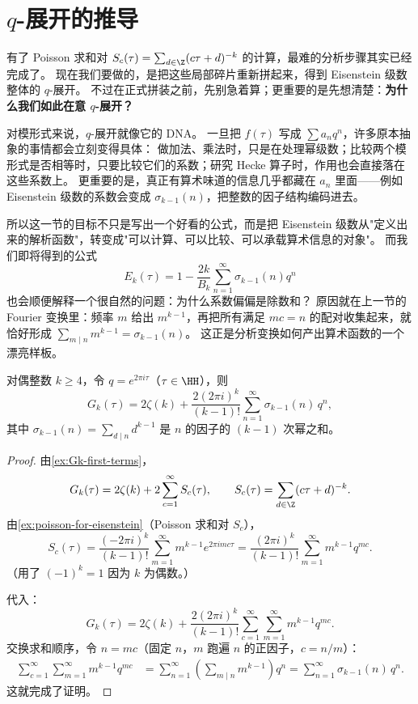 \section{$q$-展开的推导}
\label{sec:eisenstein-q-expansion}

有了 Poisson 求和对 $S_c(\tau)=\sum_{d\in\Z}(c\tau+d)^{-k}$ 的计算，最难的分析步骤其实已经完成了。
现在我们要做的，是把这些局部碎片重新拼起来，得到 Eisenstein 级数整体的 $q$-展开。
不过在正式拼装之前，先别急着算；更重要的是先想清楚：\textbf{为什么我们如此在意 $q$-展开？}

对模形式来说，$q$-展开就像它的 DNA。
一旦把 $f(\tau)$ 写成 $\sum a_n q^n$，许多原本抽象的事情都会立刻变得具体：
做加法、乘法时，只是在处理幂级数；比较两个模形式是否相等时，只要比较它们的系数；研究 Hecke 算子时，作用也会直接落在这些系数上。
更重要的是，真正有算术味道的信息几乎都藏在 $a_n$ 里面——例如 Eisenstein 级数的系数会变成 $\sigma_{k-1}(n)$，把整数的因子结构编码进去。

所以这一节的目标不只是写出一个好看的公式，而是把 Eisenstein 级数从"定义出来的解析函数"，转变成"可以计算、可以比较、可以承载算术信息的对象"。
而我们即将得到的公式
\[
  E_k(\tau)=1-\frac{2k}{B_k}\sum_{n=1}^{\infty}\sigma_{k-1}(n)q^n
\]
也会顺便解释一个很自然的问题：为什么系数偏偏是除数和？
原因就在上一节的 Fourier 变换里：频率 $m$ 给出 $m^{k-1}$，再把所有满足 $mc=n$ 的配对收集起来，就恰好形成
$\sum_{m\mid n} m^{k-1}=\sigma_{k-1}(n)$。
这正是分析变换如何产出算术函数的一个漂亮样板。



\begin{theorem}[$G_k$ 的 $q$-展开]
\label{thm:Gk-q-expansion}
对偶整数 $k \geq 4$，令 $q = e^{2\pi i\tau}$（$\tau \in \HH$），则
\[
  G_k(\tau) = 2\zeta(k)
  + \frac{2(2\pi i)^k}{(k-1)!} \sum_{n=1}^{\infty} \sigma_{k-1}(n)\, q^n,
\]
其中 $\sigma_{k-1}(n) = \sum_{d \mid n} d^{k-1}$ 是 $n$ 的因子的 $(k-1)$ 次幂之和。
\end{theorem}

\begin{proof}
由\cref{ex:Gk-first-terms}，
\[
  G_k(\tau) = 2\zeta(k) + 2\sum_{c=1}^{\infty} S_c(\tau),
  \qquad S_c(\tau) = \sum_{d \in \Z} (c\tau + d)^{-k}.
\]
由\cref{ex:poisson-for-eisenstein}（Poisson 求和对 $S_c$），
\[
  S_c(\tau) = \frac{(-2\pi i)^k}{(k-1)!} \sum_{m=1}^{\infty} m^{k-1} e^{2\pi i mc\tau}
  = \frac{(2\pi i)^k}{(k-1)!} \sum_{m=1}^{\infty} m^{k-1} q^{mc}.
\]
（用了 $(-1)^k = 1$ 因为 $k$ 为偶数。）

代入：
\[
  G_k(\tau)
  = 2\zeta(k) + \frac{2(2\pi i)^k}{(k-1)!}
    \sum_{c=1}^{\infty} \sum_{m=1}^{\infty} m^{k-1} q^{mc}.
\]
交换求和顺序，令 $n = mc$（固定 $n$，$m$ 跑遍 $n$ 的正因子，$c = n/m$）：
\begin{align}
  \sum_{c=1}^{\infty} \sum_{m=1}^{\infty} m^{k-1} q^{mc}
  &= \sum_{n=1}^{\infty} \left(\sum_{m \mid n} m^{k-1}\right) q^n
  = \sum_{n=1}^{\infty} \sigma_{k-1}(n)\, q^n.
\end{align}
这就完成了证明。
\end{proof}

